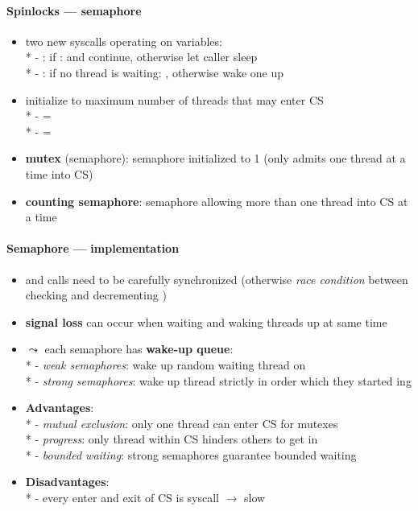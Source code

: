 \paragraph{Spinlocks --- semaphore}
\begin{itemize}
  \item two new syscalls operating on  variables: \\*
    - : if :  and continue, otherwise let caller sleep \\*
    - : if no thread is waiting: , otherwise wake one up
  \item initialize  to maximum number of threads that may enter CS \\*
    -  =  \\*
    -  = 
  \item \textbf{mutex} (semaphore): semaphore initialized to 1 (only admits one thread at a time into CS)
  \item \textbf{counting semaphore}: semaphore allowing more than one thread into CS at a time
\end{itemize}

\paragraph{Semaphore --- implementation}
\begin{itemize}
  \item {} and  calls need to be carefully synchronized (otherwise \emph{race condition} between checking and decrementing )
  \item \textbf{signal loss} can occur when waiting and waking threads up at same time
  \item \( \leadsto \) each semaphore has \textbf{wake-up queue}: \\*
    - \emph{weak semaphores}: wake up random waiting thread on  \\*
    - \emph{strong semaphores}: wake up thread strictly in order which they started ing
  \item \textbf{Advantages}: \\*
    - \emph{mutual exclusion}: only one thread can enter CS for mutexes \\*
    - \emph{progress}: only thread within CS hinders others to get in \\*
    - \emph{bounded waiting}: strong semaphores guarantee bounded waiting
  \item \textbf{Disadvantages}: \\*
    - every enter and exit of CS is syscall \( \to \) slow
\end{itemize}

